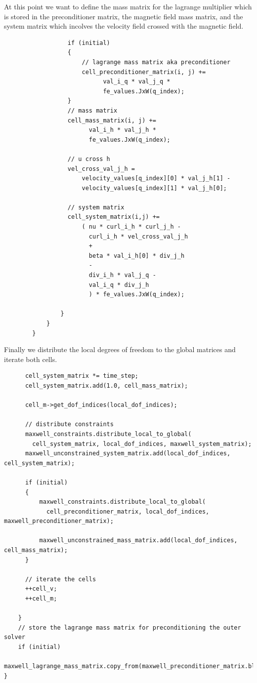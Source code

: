 \documentclass{article}
\begin{document}
At this point we want to define the mass matrix for the lagrange multiplier which is stored in the preconditioner matrix, the magnetic field mass matrix, and the system matrix which incolves the velocity field crossed with the magnetic field.
\begin{lstlisting}
                  if (initial)
                  {
                      // lagrange mass matrix aka preconditioner
                      cell_preconditioner_matrix(i, j) +=
                            val_i_q * val_j_q *
                            fe_values.JxW(q_index);
                  }
                  // mass matrix
                  cell_mass_matrix(i, j) +=
                        val_i_h * val_j_h *
                        fe_values.JxW(q_index);

                  // u cross h
                  vel_cross_val_j_h =
                      velocity_values[q_index][0] * val_j_h[1] -
                      velocity_values[q_index][1] * val_j_h[0];

                  // system matrix
                  cell_system_matrix(i,j) +=
                      ( nu * curl_i_h * curl_j_h -
                        curl_i_h * vel_cross_val_j_h
                        +
                        beta * val_i_h[0] * div_j_h
                        -
                        div_i_h * val_j_q -
                        val_i_q * div_j_h
                        ) * fe_values.JxW(q_index);

                }
            }
        }
\end{lstlisting}
Finally we distribute the local degrees of freedom to the global matrices and iterate both cells.
\begin{lstlisting}
      cell_system_matrix *= time_step;
      cell_system_matrix.add(1.0, cell_mass_matrix);

      cell_m->get_dof_indices(local_dof_indices);

      // distribute constraints
      maxwell_constraints.distribute_local_to_global(
        cell_system_matrix, local_dof_indices, maxwell_system_matrix);
      maxwell_unconstrained_system_matrix.add(local_dof_indices, cell_system_matrix);

      if (initial)
      {
          maxwell_constraints.distribute_local_to_global(
            cell_preconditioner_matrix, local_dof_indices, maxwell_preconditioner_matrix);

          maxwell_unconstrained_mass_matrix.add(local_dof_indices, cell_mass_matrix);
      }

      // iterate the cells
      ++cell_v;
      ++cell_m;

    }
    // store the lagrange mass matrix for preconditioning the outer solver
    if (initial)
        maxwell_lagrange_mass_matrix.copy_from(maxwell_preconditioner_matrix.block(1,1));
}
\end{lstlisting}
\end{document}
